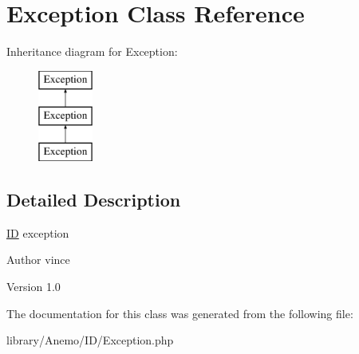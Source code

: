 \hypertarget{class_anemo_1_1_i_d_1_1_exception}{
\section{Exception Class Reference}
\label{class_anemo_1_1_i_d_1_1_exception}
}
Inheritance diagram for Exception:\begin{figure}[H]
\begin{center}
\leavevmode
\includegraphics[height=3.000000cm]{class_anemo_1_1_i_d_1_1_exception}
\end{center}
\end{figure}


\subsection{Detailed Description}
\hyperlink{class_anemo_1_1_i_d}{ID} exception \begin{DoxyAuthor}{Author}
vince 
\end{DoxyAuthor}
\begin{DoxyVersion}{Version}
1.0 
\end{DoxyVersion}


The documentation for this class was generated from the following file:\begin{DoxyCompactItemize}
\item 
library/Anemo/ID/Exception.php\end{DoxyCompactItemize}
